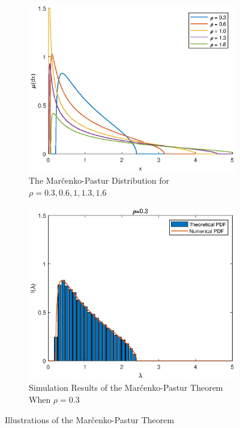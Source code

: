 \begin{figure}[htbp]
	\centering
	\begin{subfigure}{.45\linewidth}
		\includegraphics[width=\textwidth]{random-matrix-theory/figures/marchenko-pastur-distribution.eps}
		\caption{The Mar\v{c}enko-Pastur Distribution for $\rho=0.3,0.6,1,1.3,1.6$}
	\end{subfigure}
	\begin{subfigure}{.45\linewidth}
		\includegraphics[width=\textwidth]{random-matrix-theory/figures/marchenko-pastur-theorem-simulation.eps}
		\caption{Simulation Results of the Mar\v{c}enko-Pastur Theorem When $\rho=0.3$}
	\end{subfigure}
	\caption{Illustrations of the Mar\v{c}enko-Pastur Theorem}
\end{figure}

